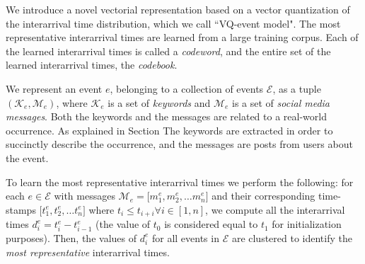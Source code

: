 
We introduce a novel vectorial representation based on a vector quantization of the
interarrival time distribution, which we call ``VQ-event model".
The most representative interarrival times are learned from a large
training corpus.  Each of the learned interarrival times is called
a \emph{codeword}, and the entire set of the learned interarrival times, the \emph{codebook}.

We represent an event $e$, belonging to a collection of events
$\mathcal{E}$, as a tuple $(\mathcal{K}_e, \mathcal{M}_e)$, where
$\mathcal{K}_e$ is a set of \emph{keywords} and $\mathcal{M}_e$ is a
set of \emph{social media messages}. Both
the keywords and the messages are related to a real-world occurrence. 
As explained in Section The keywords are extracted in
order to succinctly describe the occurrence, and the messages are
posts from users about the event.

To learn the most representative interarrival times we perform
the following: for each $e \in
\mathcal{E}$ with messages $\mathcal{M}_e = \lbrack m_{1}^e, m_{2}^e,
\ldots m_{n}^e \rbrack$ and their corresponding time-stamps $\lbrack
t_{1}^e, t_{2}^e, \ldots t_{n}^e \rbrack$ where $t_{i} \leq t_{i+i}
\forall i \in [1,n]$, we compute all the interarrival times $d_{i}^e =
t_{i}^e-t_{i-1}^e$ (the value of $t_{0}$ is considered equal to
$t_{1}$ for initialization purposes). Then, the values of $d_{i}^e$
for all events in $\mathcal{E}$ are clustered to identify the {\em
  most representative} interarrival times.


